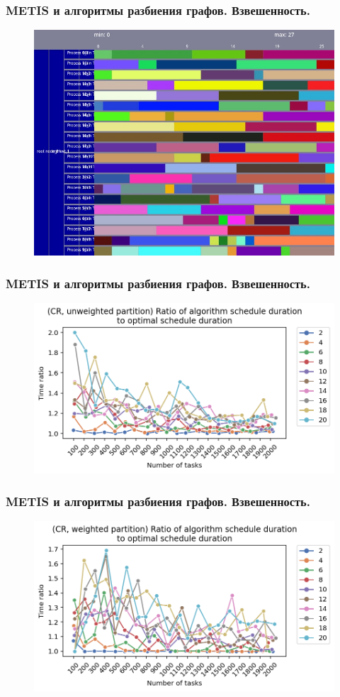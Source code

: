 \begin{frame}
    \frametitle{METIS и алгоритмы разбиения графов. Взвешенность.}
    \begin{figure}
        \includegraphics[height=0.8\textheight]{imgs/schedule_balanced.jpg}
    \end{figure}
\end{frame}

\begin{frame}
    \frametitle{METIS и алгоритмы разбиения графов. Взвешенность.}
    \begin{figure}
        \includegraphics[width=0.8\linewidth]{imgs/unweighted_ratio.png}
    \end{figure}
\end{frame}

\begin{frame}
    \frametitle{METIS и алгоритмы разбиения графов. Взвешенность.}
    \begin{figure}
        \includegraphics[width=0.8\linewidth]{imgs/weighted_ratio.png}
    \end{figure}
\end{frame}